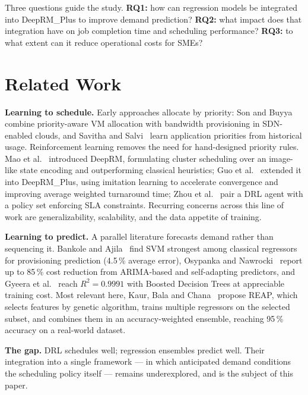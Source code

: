 \documentclass[runningheads]{llncs}
\begin{document}
Three questions guide the study. \textbf{RQ1:} how can regression
models be integrated into DeepRM\_Plus to improve demand prediction?
\textbf{RQ2:} what impact does that integration have on job completion
time and scheduling performance? \textbf{RQ3:} to what extent can it
reduce operational costs for SMEs?

\section{Related Work}

\textbf{Learning to schedule.} Early approaches allocate by priority:
Son and Buyya~\cite{son2019} combine priority-aware VM allocation with
bandwidth provisioning in SDN-enabled clouds, and Savitha and
Salvi~\cite{savitha2021} learn application priorities from historical
usage. Reinforcement learning removes the need for hand-designed
priority rules. Mao et al.~\cite{mao2016} introduced DeepRM,
formulating cluster scheduling over an image-like state encoding and
outperforming classical heuristics; Guo et al.~\cite{guo2021} extended
it into DeepRM\_Plus, using imitation learning to accelerate
convergence and improving average weighted turnaround time; Zhou
et al.~\cite{zhou2021} pair a DRL agent with a policy set enforcing
SLA constraints. Recurring concerns across this line of work are
generalizability, scalability, and the data appetite of training.

\textbf{Learning to predict.} A parallel literature forecasts demand
rather than sequencing it. Bankole and Ajila~\cite{bankole2013} find
SVM strongest among classical regressors for provisioning prediction
(4.5\,\% average error), Osypanka and
Nawrocki~\cite{osypanka2022,osypanka2023} report up to 85\,\% cost
reduction from ARIMA-based and self-adapting predictors, and Gyeera
et al.~\cite{gyeera2023} reach $R^2 = 0.9991$ with Boosted Decision
Trees at appreciable training cost. Most relevant here, Kaur, Bala and
Chana~\cite{kaur2019} propose REAP, which selects features by genetic
algorithm, trains multiple regressors on the selected subset, and
combines them in an accuracy-weighted ensemble, reaching 95\,\%
accuracy on a real-world dataset.

\textbf{The gap.} DRL schedules well; regression ensembles predict
well. Their integration into a single framework --- in which
anticipated demand conditions the scheduling policy itself --- remains
underexplored, and is the subject of this paper.
\end{document}
